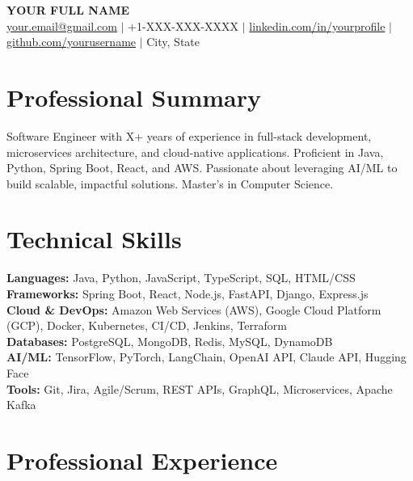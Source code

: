 \documentclass[11pt,a4paper]{article}
\begin{document}
{\centering
{\LARGE\bfseries YOUR FULL NAME}\\[4pt]
{\small
\href{mailto:your.email@gmail.com}{your.email@gmail.com} $\vert$
+1-XXX-XXX-XXXX $\vert$
\href{https://linkedin.com/in/yourprofile}{linkedin.com/in/yourprofile} $\vert$
\href{https://github.com/yourusername}{github.com/yourusername} $\vert$
City, State
}\\
}

\section{Professional Summary}
Software Engineer with X+ years of experience in full-stack development, microservices architecture, and cloud-native applications. Proficient in Java, Python, Spring Boot, React, and AWS. Passionate about leveraging AI/ML to build scalable, impactful solutions. Master's in Computer Science.

\section{Technical Skills}
\textbf{Languages:} Java, Python, JavaScript, TypeScript, SQL, HTML/CSS\\
\textbf{Frameworks:} Spring Boot, React, Node.js, FastAPI, Django, Express.js\\
\textbf{Cloud \& DevOps:} Amazon Web Services (AWS), Google Cloud Platform (GCP), Docker, Kubernetes, CI/CD, Jenkins, Terraform\\
\textbf{Databases:} PostgreSQL, MongoDB, Redis, MySQL, DynamoDB\\
\textbf{AI/ML:} TensorFlow, PyTorch, LangChain, OpenAI API, Claude API, Hugging Face\\
\textbf{Tools:} Git, Jira, Agile/Scrum, REST APIs, GraphQL, Microservices, Apache Kafka

\section{Professional Experience}
\end{document}
